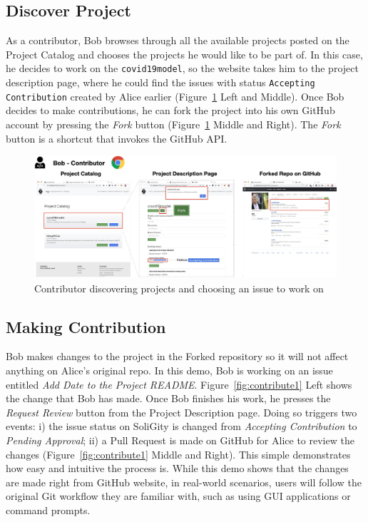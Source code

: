 \documentclass[12pt]{article}
\renewcommand{\_}{\kern-1.5pt\textunderscore\kern-1.5pt}
\begin{document}
\subsection{Discover Project}

As a contributor, Bob browses through all the available projects posted on the Project Catalog and
chooses the projects he would like to be part of. In this case, he decides to work on the \texttt{covid19model},
so the website takes him to the project description page, where he could find the issues with status
\texttt{Accepting Contribution} created by Alice earlier (Figure~\ref{fig:discover1} Left and Middle).
Once Bob decides to make contributions, he can fork the project into his own GitHub account by pressing
the \textit{Fork} button (Figure~\ref{fig:discover1} Middle and Right). The \textit{Fork} button is a
shortcut that invokes the GitHub API.

\begin{figure}[H]
	\centering
	\includegraphics[width=16cm]{graphs/52. discover_1.png}
	\caption{Contributor discovering projects and choosing an issue to work on}
	\label{fig:discover1}
\end{figure}

\subsection{Making Contribution}

Bob makes changes to the project in the Forked repository so it will not affect anything on Alice's
original repo. In this demo, Bob is working on an issue entitled \textit{Add Date to the Project README}.
Figure~\ref{fig:contribute1} Left shows the change that Bob has made. Once Bob finishes his work, he
presses the \textit{Request Review} button from the Project Description page. Doing so triggers two
events: i) the issue status on SoliGity is changed from \textit{Accepting Contribution} to
\textit{Pending Approval}; ii) a Pull Request is made on GitHub for Alice to review the changes
(Figure~\ref{fig:contribute1} Middle and Right).  This simple demonstrates how easy and intuitive the
process is. While this demo shows that the changes are made right from GitHub website, in real-world
scenarios, users will follow the original Git workflow they are familiar with, such as using GUI
applications or command prompts.
\end{document}
